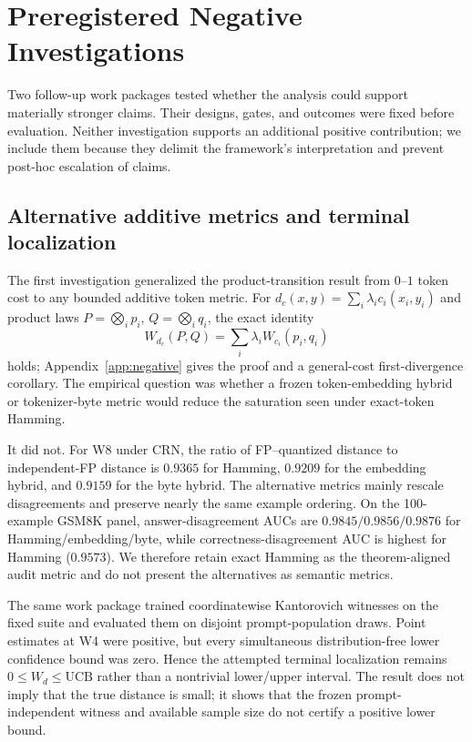 \section{Preregistered Negative Investigations}
\label{sec:negative}

Two follow-up work packages tested whether the analysis could support materially stronger claims. Their designs, gates, and outcomes were fixed before evaluation. Neither investigation supports an additional positive contribution; we include them because they delimit the framework's interpretation and prevent post-hoc escalation of claims.

\subsection{Alternative additive metrics and terminal localization}
The first investigation generalized the product-transition result from $0$--$1$ token cost to any bounded additive token metric. For $d_c(x,y)=\sum_i\lambda_i c_i(x_i,y_i)$ and product laws $P=\bigotimes_i p_i$, $Q=\bigotimes_i q_i$, the exact identity
\[
W_{d_c}(P,Q)=\sum_i\lambda_i W_{c_i}(p_i,q_i)
\]
holds; Appendix~\ref{app:negative} gives the proof and a general-cost first-divergence corollary. The empirical question was whether a frozen token-embedding hybrid or tokenizer-byte metric would reduce the saturation seen under exact-token Hamming.

It did not. For W8 under CRN, the ratio of FP--quantized distance to independent-FP distance is $0.9365$ for Hamming, $0.9209$ for the embedding hybrid, and $0.9159$ for the byte hybrid. The alternative metrics mainly rescale disagreements and preserve nearly the same example ordering. On the 100-example GSM8K panel, answer-disagreement AUCs are $0.9845/0.9856/0.9876$ for Hamming/embedding/byte, while correctness-disagreement AUC is highest for Hamming ($0.9573$). We therefore retain exact Hamming as the theorem-aligned audit metric and do not present the alternatives as semantic metrics.

The same work package trained coordinatewise Kantorovich witnesses on the fixed suite and evaluated them on disjoint prompt-population draws. Point estimates at W4 were positive, but every simultaneous distribution-free lower confidence bound was zero. Hence the attempted terminal localization remains
$0\le W_d\le\mathrm{UCB}$ rather than a nontrivial lower/upper interval. The result does not imply that the true distance is small; it shows that the frozen prompt-independent witness and available sample size do not certify a positive lower bound.

